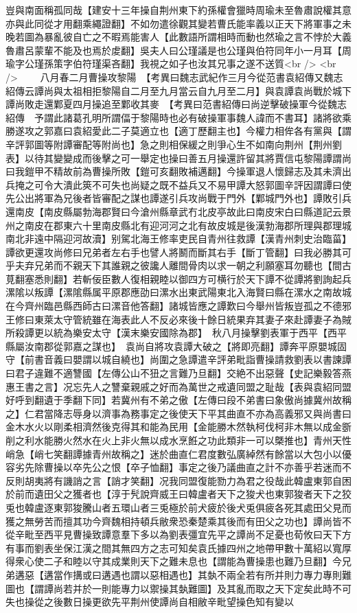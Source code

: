 豈與南面稱孤同哉【建安十三年操自荆州東下約孫權會獵時周瑜未至魯肅說權其意亦與此同從才用翻乘繩證翻】不如勿遣徐觀其變若曹氏能率義以正天下將軍事之未晚若圖為暴亂彼自亡之不暇焉能害人【此數語所謂相時而動也然瑜之言不悖於大義魯肅呂蒙輩不能及也焉於䖍翻】吳夫人曰公瑾議是也公瑾與伯符同年小一月耳【周瑜字公瑾孫策字伯符瑾渠吝翻】我視之如子也汝其兄事之遂不送質<br />
<br />
　　八月春二月曹操攻黎陽　【考異曰魏志武紀作三月今從范書袁紹傳又魏志紹傳云譚尚與太祖相拒黎陽自二月至九月當云自九月至二月】與袁譚袁尚戰於城下譚尚敗走還鄴夏四月操追至鄴收其麥　【考異曰范書紹傳曰尚逆擊破操軍今從魏志紹傳　予謂此諸葛孔明所謂偪于黎陽時也必有破操軍事魏人諱而不書耳】諸將欲乘勝遂攻之郭嘉曰袁紹愛此二子莫適立也【適丁歷翻主也】今權力相侔各有黨與【謂辛評郭圖等附譚審配等附尚也】急之則相保緩之則爭心生不如南向荆州【荆州劉表】以待其變變成而後擊之可一舉定也操曰善五月操還許留其將賈信屯黎陽譚謂尚曰我鎧甲不精故前為曹操所敗【鎧可亥翻敗補邁翻】今操軍退人懷歸志及其未濟出兵掩之可令大潰此筴不可失也尚疑之既不益兵又不易甲譚大怒郭圖辛評因謂譚曰使先公出將軍為兄後者皆審配之謀也譚遂引兵攻尚戰于門外【鄴城門外也】譚敗引兵還南皮【南皮縣屬勃海郡賢曰今滄州縣章武冇北皮亭故此曰南皮宋白曰縣道記云景州之南皮在郡東六十里南皮縣北有迎河河之北有故皮城是後漢勃海郡所理與郡理城南北非遠中隔迎河故瀆】别駕北海王修率吏民自青州往救譚【漢青州刺史治臨菑】譚欲更還攻尚修曰兄弟者左右手也譬人將鬭而斷其右手【斷丁管翻】曰我必勝其可乎夫弃兄弟而不親天下其誰親之彼讒人離間骨肉以求一朝之利願塞耳勿聽也【間古莧翻塞悉則翻】若斬佞臣數人復相親睦以御四方可横行於天下譚不從譚將劉詢起兵漯隂以叛譚【漯隂縣属平原郡應劭曰漯水出東武陽東北入海賢曰縣在漯水之南故城在今齊州臨邑縣西師古曰漯音他答翻】諸城皆應之譚歎曰今舉州皆叛豈孤之不德邪王修曰東萊太守管統雖在海表此人不反必來後十餘日統果弃其妻子來赴譚妻子為賊所殺譚更以統為樂安太守【漢末樂安國除為郡】　秋八月操擊劉表軍于西平【西平縣屬汝南郡從郭嘉之謀也】　袁尚自將攻袁譚大破之【將即亮翻】譚奔平原嬰城固守【前書音義曰嬰謂以城自繞也】尚圍之急譚遣辛評弟毗詣曹操請救劉表以書諫譚曰君子違難不適讐國【左傳公山不狃之言難乃旦翻】交絶不出惡聲【史記樂毅答燕惠王書之言】况忘先人之讐棄親戚之好而為萬世之戒遺同盟之耻哉【表與袁紹同盟好呼到翻遺于季翻下同】若冀州有不弟之傲【左傳曰段不弟書曰象傲尚據冀州故稱之】仁君當降志辱身以濟事為務事定之後使天下平其曲直不亦為高義邪又與尚書曰金木水火以剛柔相濟然後克得其和能為民用【金能勝木然執柯伐柯非木無以成金斵削之利水能勝火然水在火上非火無以成水烹餁之功此類非一可以槩推也】青州天性峭急【峭七笑翻譚據青州故稱之】迷於曲直仁君度數弘廣綽然有餘當以大包小以優容劣先除曹操以卒先公之恨【卒子恤翻】事定之後乃議曲直之計不亦善乎若迷而不反則胡夷將有譏誚之言【誚才笑翻】况我同盟復能勠力為君之役哉此韓盧東郭自困於前而遺田父之獲者也【淳于髠說齊威王曰韓盧者天下之狻犬也東郭狻者天下之狡兎也韓盧逐東郭狻騰山者五環山者三兎極於前犬疲於後犬兎俱疲各死其處田父見而獲之無勞苦而擅其功今齊魏相持頓兵敝衆恐秦楚乘其後而有田父之功也】譚尚皆不從辛毗至西平見曹操致譚意羣下多以為劉表彊宜先平之譚尚不足憂也荀攸曰天下方有事而劉表坐保江漢之間其無四方之志可知矣袁氏據四州之地帶甲數十萬紹以寬厚得衆心使二子和睦以守其成業則天下之難未息也【謂能為曹操患也難乃旦翻】今兄弟遘惡【遘當作搆或曰遘遇也謂以惡相遇也】其埶不兩全若有所并則力專力專則難圖也【謂譚尚若并於一則能專力以禦操其埶難圖】及其亂而取之天下定矣此時不可失也操從之後數日操更欲先平荆州使譚尚自相敝辛毗望操色知有變以